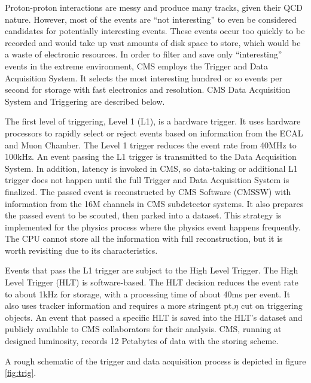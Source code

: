 Proton-proton interactions are messy and produce many tracks, given their QCD nature.
However, most of the events are ``not interesting'' to even be considered candidates for potentially interesting events.
These events occur too quickly to be recorded and would take up vast amounts of disk space to store, which would be a waste of electronic resources.
In order to filter and save only ``interesting'' events in the extreme environment, CMS employs the Trigger and Data Acquisition System.
It selects the most interesting hundred or so events per second for storage with fast electronics and resolution.
CMS Data Acquisition System and Triggering are described below.

The first level of triggering, Level 1 (L1), is a hardware trigger.
It uses hardware processors to rapidly select or reject events based on information from the ECAL and Muon Chamber.
The Level 1 trigger reduces the event rate from 40MHz to 100kHz.
An event passing the L1 trigger is transmitted to the Data Acquisition System.
In addition, latency is invoked in CMS, so data-taking or additional L1 trigger does not happen until the full Trigger and Data Acquisition System is finalized.
The passed event is reconstructed by CMS Software (CMSSW) with information from the 16M channels in CMS subdetector systems.
It also prepares the passed event to be scouted, then parked into a dataset.
This strategy is implemented for the physics process where the physics event happens frequently. The CPU cannot store all the information with full reconstruction, but it is worth revisiting due to its characteristics.


Events that pass the L1 trigger are subject to the High Level Trigger.
The High Level Trigger (HLT) is software-based.
The HLT decision reduces the event rate to about 1kHz for storage, with a processing time of about 40ms per event.
It also uses tracker information and requires a more stringent pt,$\eta$ cut on triggering objects.
An event that passed a specific HLT is saved into the HLT's dataset and publicly available to CMS collaborators for their analysis.
CMS, running at designed luminosity, records 12 Petabytes of data with the storing scheme.


A rough schematic of the trigger and data acquisition process is depicted in figure \ref{fig:trig}.
